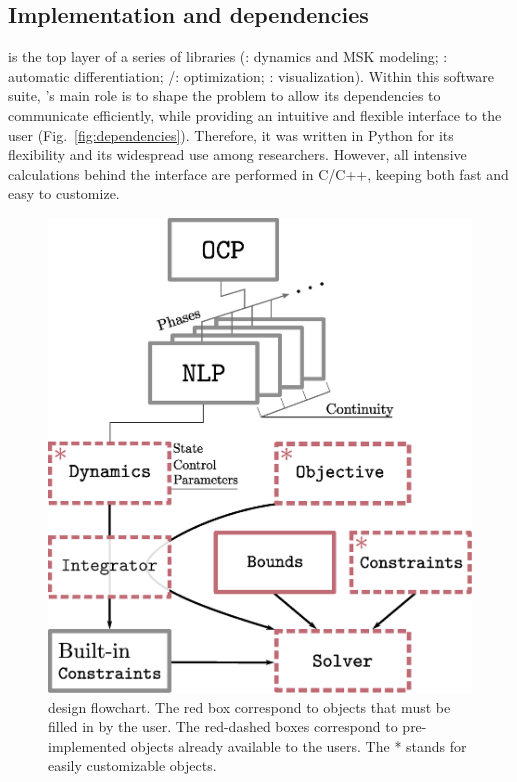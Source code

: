 \subsection{Implementation and dependencies}
\bioptim is the top layer of a series of libraries (\biorbd: dynamics and MSK modeling; \casadi: automatic differentiation; \ipopt/\acados: optimization; \bioviz: visualization).
Within this software suite, \bioptim 's main role is to shape the problem to allow its dependencies to communicate efficiently, while providing an intuitive and flexible interface to the user (Fig.~\ref{fig:dependencies}).
Therefore, it was written in Python for its flexibility and its widespread use among researchers.
However, all intensive calculations behind the interface are performed in C/C++, keeping \bioptim both fast and easy to customize.

\begin{figure}[t!]
\centering
\includegraphics[width=0.9\columnwidth]{figures/design.eps}
\caption{\bioptim design flowchart. The red box correspond to objects that must be filled in by the user. The red-dashed boxes correspond to pre-implemented objects already available to the users. The * stands for easily customizable objects.}
\label{fig:flowchart}
\vspace*{-0.5cm}
\end{figure}


